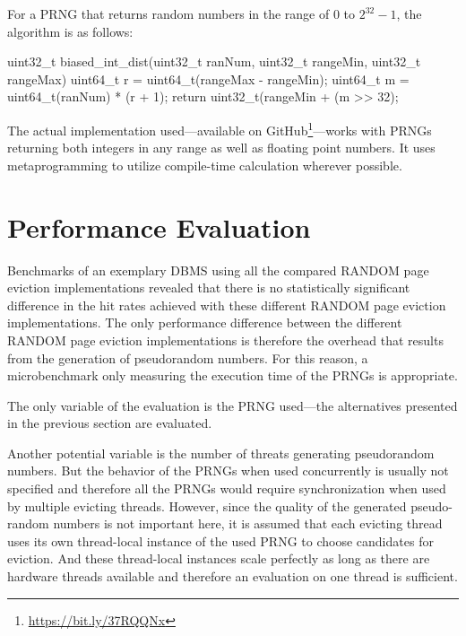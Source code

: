     For a PRNG that returns random numbers in the range of $0$ to $2^{32} - 1$, the algorithm is as follows:
\begin{@empty}
    \lstset{
        language = [ISO]C++
    }
\begin{centeredshadowboxlisting}
uint32_t biased_int_dist(uint32_t ranNum,
                         uint32_t rangeMin,
                         uint32_t rangeMax) {
    uint64_t r = uint64_t(rangeMax - rangeMin);
    uint64_t m = uint64_t(ranNum) * (r + 1);
    return uint32_t(rangeMin + (m >> 32);
}
\end{centeredshadowboxlisting}
\end{@empty}
    The actual implementation used---available on GitHub\footnote{\url{https://bit.ly/37RQQNx}}---works with PRNGs returning both integers in any range as well as floating point numbers. It uses metaprogramming to utilize compile-time calculation wherever possible.

\section[Performance Evaluation]{Performance Evaluation} \label{sec:random-performance}

    Benchmarks of an exemplary DBMS using all the compared RANDOM page eviction implementations revealed that there is no statistically significant difference in the hit rates achieved with these different RANDOM page eviction implementations. The only performance difference between the different RANDOM page eviction implementations is therefore the overhead that results from the generation of pseudorandom numbers. For this reason, a microbenchmark only measuring the execution time of the PRNGs is appropriate.

    The only variable of the evaluation is the PRNG used---the alternatives presented in the previous section are evaluated.

    Another potential variable is the number of threats generating pseudorandom numbers. But the behavior of the PRNGs when used concurrently is usually not specified and therefore all the PRNGs would require synchronization when used by multiple evicting threads. However, since the quality of the generated pseudo-random numbers is not important here, it is assumed that each evicting thread uses its own thread-local instance of the used PRNG to choose candidates for eviction. And these thread-local instances scale perfectly as long as there are hardware threads available and therefore an evaluation on one thread is sufficient.

